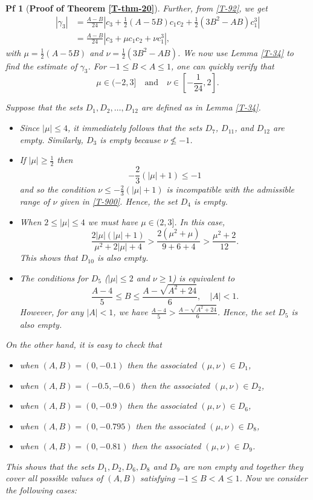 \documentclass[10pt,a4paper]{amsart}
\newtheorem{pf}{Pf}
\begin{document}
\begin{pf}[\textbf{Proof of Theorem \ref{T-thm-20}}]
Further, from \eqref{T-92}, we get
\begin{align}\label{T-905}
|\gamma_{3}|
&=\frac{A-B}{24}\left|c_3+\frac{1}{2}(A-5B)c_{1}c_{2}+\frac{1}{2}(3B^2-AB)c_1^3\right|\\
&= \frac{A-B}{24}\left|c_3+\mu c_{1}c_{2}+\nu c_1^3\right|\nonumber,
\end{align}
with \(\mu = \frac{1}{2}(A - 5B)\) and \(\nu = \frac{1}{2}(3B^2 - AB)\). We now use Lemma \ref{T-34} to find the estimate of $\gamma_3$. For \(-1 \leq B < A \leq 1\), one can quickly verify that 
\begin{equation}\label{T-900}
\mu \in (-2, 3]\quad \text{and}\quad \nu \in \left[-\frac{1}{24}, 2\right].
\end{equation}

Suppose that the sets $D_1,D_2,\ldots,D_{12}$ are defined as in Lemma \ref{T-34}.
\begin{itemize}
\item Since \(|\mu| \le 4\), it immediately follows that the sets \(D_7\), \(D_{11}\), and \(D_{12}\) are empty. Similarly, $D_3$ is empty because $\nu \not\le -1$.

\item If $|\mu|\ge \frac{1}{2}$ then
$$-\frac{2}{3}(|\mu| + 1)\le -1 $$
and so the condition $\nu \leq -\frac{2}{3}(|\mu| + 1)$ is incompatible with the admissible range of \(\nu\) given in \eqref{T-900}. Hence, the set $D_4$ is empty.

\item When $2\le |\mu|\le 4$ we must have $\mu\in(2,3]$. In this case,
$$
\frac{2|\mu|(|\mu| + 1)}{\mu^2 + 2|\mu| + 4}> \frac{2(\mu^2 + \mu)}{9 + 6 + 4}> \frac{\mu^2 + 2}{12}.
$$
This shows that \(D_{10}\) is also empty.

\item The conditions for $D_5$ ($|\mu| \le 2$ and $\nu \ge 1$) is equivalent to 
\[
\frac{A-4}{5} \leq B \leq \frac{A - \sqrt{A^2 + 24}}{6}, \quad |A| < 1.
\]
However, for any \(|A| < 1\), we have \(\frac{A-4}{5} > \frac{A - \sqrt{A^2 + 24}}{6}\). Hence, the set \(D_5\) is also empty.

\end{itemize}

On the other hand, it is easy to check that 
\begin{itemize}
\item when \((A,B)=(0,-0.1)\) then the associated $(\mu,\nu)\in D_1$,
\item when \((A,B)=(-0.5,-0.6)\) then the associated $(\mu,\nu)\in D_2$,
\item when \((A,B)=(0,-0.9)\) then the associated $(\mu,\nu)\in D_6$,
\item when \((A,B)=(0,-0.795)\) then the associated $(\mu,\nu)\in D_8$,
\item when \((A,B)=(0,-0.81)\) then the associated $(\mu,\nu)\in D_9$.
\end{itemize}
This shows that the sets $D_1, D_2, D_6, D_8$ and $D_9$ are non empty and together they cover all possible values of $(A,B)$ satisfying \(-1 \leq B < A \leq 1\).
Now we consider the following cases:\\



\end{pf}
\end{document}
